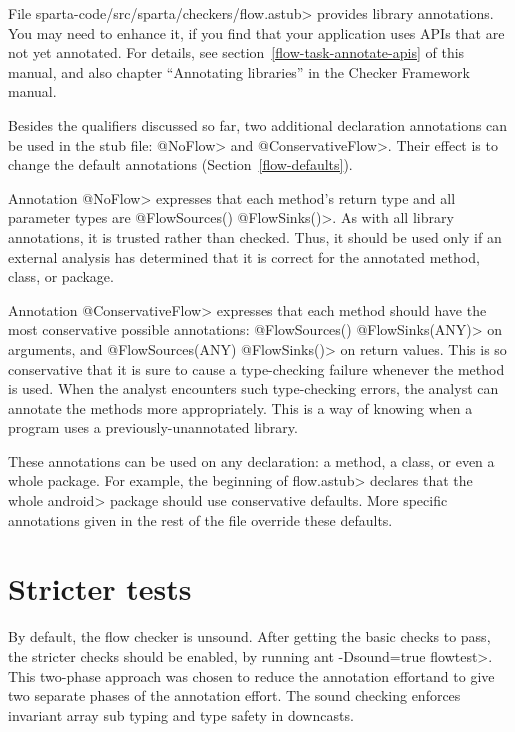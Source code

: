 File \<sparta-code/src/sparta/checkers/flow.astub> provides library
annotations.  You may need to enhance it, if you find that your application
uses APIs that are not yet annotated.  For details, see
section~\ref{flow-task-annotate-apis} of this manual, and also 
chapter
``Annotating libraries'' in the Checker Framework manual.

\label{ConservativeFlow}

Besides the qualifiers discussed so far, two additional declaration
annotations can be used in the stub file: \<@NoFlow> and \<@ConservativeFlow>.
Their effect is to change the default annotations (Section~\ref{flow-defaults}).

Annotation \<@NoFlow> expresses that each method's return type and all
parameter types are \<@FlowSources({}) @FlowSinks({})>.  As with all
library annotations, it is trusted rather than checked.  Thus, it should be
used only if an external analysis has determined that it is correct for the
annotated method, class, or package.

Annotation \<@ConservativeFlow> expresses that each method should have the
most conservative possible annotations:
  \<@FlowSources({}) @FlowSinks(ANY)> on arguments, and
  \<@FlowSources(ANY) @FlowSinks({})> on return values.
This is so conservative that it is sure to cause a type-checking failure
whenever the method is used.
When the analyst encounters such type-checking errors, the analyst can
annotate the methods more appropriately.  This is a way of knowing when a
program uses a previously-unannotated library.

These annotations can be used on any declaration: a method, a class,
or even a whole package.
For example, the beginning of \<flow.astub> declares that the
whole \<android> package should use conservative defaults.
More specific annotations given in the rest of the file override these
defaults.


\section{Stricter tests}

By default, the flow checker is unsound.  After getting the basic checks to pass, the
 stricter checks should be enabled, by running \<ant -Dsound=true flowtest>.
This two-phase approach was chosen to reduce
the annotation effortand to give two separate phases of
the annotation effort.
 The sound checking enforces invariant 
array sub typing and type safety in downcasts.


